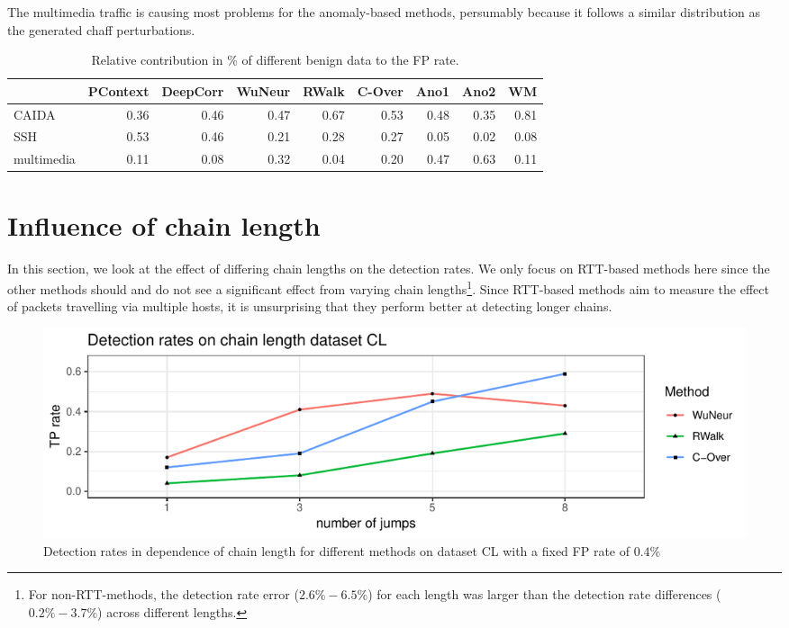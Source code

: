 \documentclass[runningheads,11pt]{llncs}\usepackage[]{graphicx}\usepackage[]{color}
\makeatletter
\def\maxwidth{ %
  \ifdim\Gin@nat@width>\linewidth
    \linewidth
  \else
    \Gin@nat@width
  \fi
}
\newenvironment{knitrout}{}{} %
\makeatother
\begin{document}
The multimedia traffic is causing most problems for the anomaly-based methods, persumably because it follows a similar distribution as the generated chaff perturbations.
\begin{table}
\centering
\begin{tabular}{l|r|r|r|r|r|r|r|r}
  \hline
 & PContext & DeepCorr & WuNeur & RWalk & C-Over & Ano1 & Ano2 & WM \\ 
  \hline
CAIDA & 0.36 & 0.46 & 0.47 & 0.67 & 0.53 & 0.48 & 0.35 & 0.81 \\ 
  SSH & 0.53 & 0.46 & 0.21 & 0.28 & 0.27 & 0.05 & 0.02 & 0.08 \\ 
  multimedia & 0.11 & 0.08 & 0.32 & 0.04 & 0.20 & 0.47 & 0.63 & 0.11 \\ 
   \hline
\end{tabular}

\caption{Relative contribution in \% of different benign data to the FP rate.}\label{Tab:dfFP}
\end{table}




\section{Influence of chain length}\label{Sec:Chainl}

In this section, we look at the effect of differing chain lengths on the detection rates. We only focus on RTT-based methods here since the other methods should and do not see a significant effect from varying chain lengths\footnote{For non-RTT-methods, the detection rate error ($2.6\%-6.5\%$) for each length was larger than the detection rate differences ($0.2\%-3.7\%$) across different lengths.}. Since RTT-based methods aim to measure the effect of packets travelling via multiple hosts, it is unsurprising that they perform better at detecting longer chains. 

\begin{knitrout}
\color{fgcolor}\begin{figure}
\includegraphics[width=\maxwidth]{figure/Influencechainl-1} \caption[Detection rates in dependence of chain length for different methods on dataset CL with a fixed FP rate of $0.4\%$]{Detection rates in dependence of chain length for different methods on dataset CL with a fixed FP rate of $0.4\%$}\label{fig:Influencechainl}
\end{figure}


\end{knitrout}
\end{document}
